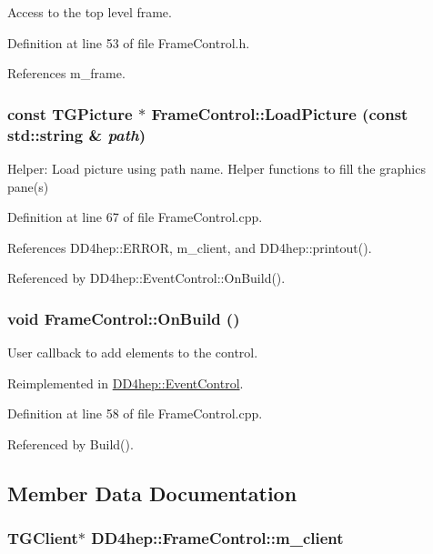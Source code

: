 Access to the top level frame. 

Definition at line 53 of file FrameControl.h.

References m\_\-frame.\hypertarget{class_d_d4hep_1_1_frame_control_a9c86d20503c0dcf96f5a13bced00ecc0}{
\subsubsection[{LoadPicture}]{\setlength{\rightskip}{0pt plus 5cm}const TGPicture $\ast$ FrameControl::LoadPicture (const std::string \& {\em path})}}
\label{class_d_d4hep_1_1_frame_control_a9c86d20503c0dcf96f5a13bced00ecc0}


Helper: Load picture using path name. Helper functions to fill the graphics pane(s) 

Definition at line 67 of file FrameControl.cpp.

References DD4hep::ERROR, m\_\-client, and DD4hep::printout().

Referenced by DD4hep::EventControl::OnBuild().\hypertarget{class_d_d4hep_1_1_frame_control_a934ef76420162167364133e43c7be8b5}{
\subsubsection[{OnBuild}]{\setlength{\rightskip}{0pt plus 5cm}void FrameControl::OnBuild ()}}
\label{class_d_d4hep_1_1_frame_control_a934ef76420162167364133e43c7be8b5}


User callback to add elements to the control. 

Reimplemented in \hyperlink{class_d_d4hep_1_1_event_control_ada9bb8f5e290f6acb6832208f407a53a}{DD4hep::EventControl}.

Definition at line 58 of file FrameControl.cpp.

Referenced by Build().

\subsection{Member Data Documentation}
\hypertarget{class_d_d4hep_1_1_frame_control_aaca4e5ed19a1982777f7d19bb7dd6a6b}{
\subsubsection[{m\_\-client}]{\setlength{\rightskip}{0pt plus 5cm}TGClient$\ast$ {\bf DD4hep::FrameControl::m\_\-client}}}
\label{class_d_d4hep_1_1_frame_control_aaca4e5ed19a1982777f7d19bb7dd6a6b}



